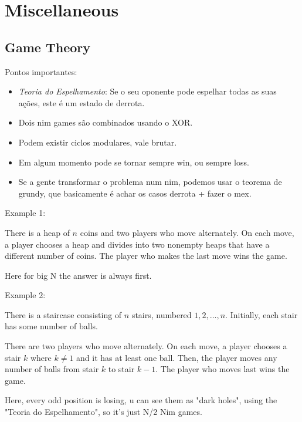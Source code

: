 \chapter{Miscellaneous}
    \section{Game Theory}
        Pontos importantes:
        \begin{itemize}
            \item \textit{Teoria do Espelhamento}: Se o seu oponente pode espelhar todas as suas ações, este é um estado de derrota.
            \item Dois nim games são combinados usando o XOR.
            \item Podem existir ciclos modulares, vale brutar.
            \item Em algum momento pode se tornar sempre win, ou sempre loss.
            \item Se a gente transformar o problema num nim, podemos usar o teorema de grundy, que basicamente é achar os casos derrota + fazer o mex.
        \end{itemize}
        
        Example 1:

        There is a heap of $n$ coins and two players who move alternately. On each move, a player chooses a heap and divides into two nonempty heaps that have a different number of coins. The player who makes the last move wins the game.

        Here for big N the answer is always first.

        
    

        Example 2:

        There is a staircase consisting of $n$ stairs, numbered $1,2,\ldots,n$. Initially, each stair has some number of balls.

        There are two players who move alternately. On each move, a player chooses a stair $k$ where $k\neq1$ and it has at least one ball. Then, the player moves any number of balls from stair $k$ to stair $k-1$. The player who moves last wins the game.

        Here, every odd position is losing, u can see them as "dark holes", using the "Teoria do Espelhamento", so it's just N/2 Nim games.

        
    

